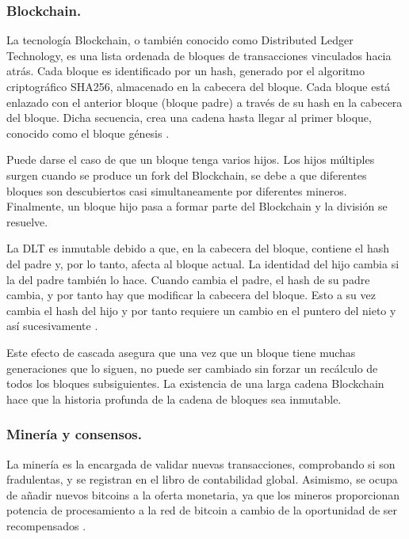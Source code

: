 \subsubsection{Blockchain.}

La tecnología Blockchain, o también conocido como Distributed Ledger Technology, es una lista ordenada de bloques de 
transacciones vinculados hacia atrás. Cada bloque es identificado por un hash, generado por el algoritmo criptográfico 
SHA256, almacenado en la cabecera del bloque. Cada bloque está enlazado con el anterior bloque (bloque padre) a través 
de su hash en la cabecera del bloque. Dicha secuencia, crea una cadena hasta llegar al primer bloque, conocido como 
el bloque génesis \cite{antonopoulos2014mastering}.

\vspace{5mm}

\noindent Puede darse el caso de que un bloque tenga varios hijos. Los hijos múltiples surgen cuando se produce un fork 
del Blockchain, se debe a que diferentes bloques son descubiertos casi simultaneamente por diferentes mineros. 
Finalmente, un bloque hijo pasa a formar parte del Blockchain y la división se resuelve. 

\vspace{5mm}

\noindent La DLT es inmutable debido a que, en la cabecera del bloque, contiene el hash del padre y, por lo tanto, 
afecta al bloque actual. La identidad del hijo cambia si la del padre también lo hace. Cuando cambia el padre, el 
hash de su padre cambia, y por tanto hay que modificar la cabecera del bloque. Esto a su vez cambia el hash del hijo y 
por tanto requiere un cambio en el puntero del nieto y así sucesivamente \cite{antonopoulos2014mastering}.

\vspace{5mm}

\noindent Este efecto de cascada asegura que una vez que un bloque tiene muchas generaciones que lo siguen, no puede 
ser cambiado sin forzar un recálculo de todos los bloques subsiguientes. La existencia de una larga cadena Blockchain 
hace que la historia profunda de la cadena de bloques sea inmutable.

\subsubsection{Minería y consensos.}

La minería es la encargada de validar nuevas transacciones, comprobando si son fradulentas, y se registran en el 
libro de contabilidad global. Asimismo, se ocupa de añadir nuevos bitcoins a la oferta monetaria, ya que los 
mineros proporcionan potencia de procesamiento a la red de bitcoin a cambio de la oportunidad de ser recompensados 
\cite{antonopoulos2014mastering}.


